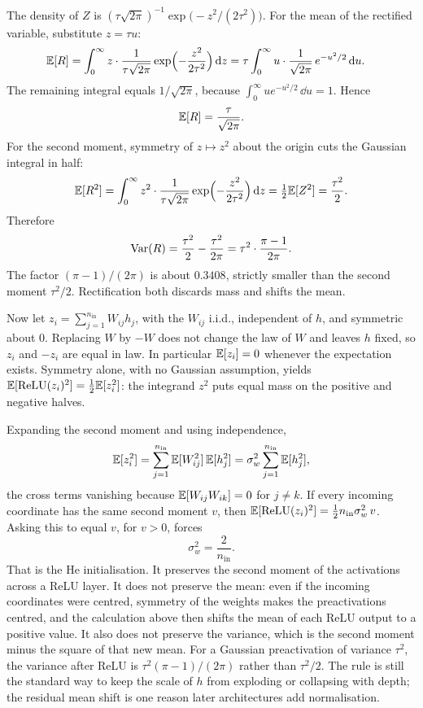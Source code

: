 The density of \(Z\) is \((\tau\sqrt{2\pi})^{-1}\exp\bigl(-z^2/(2\tau^2)\bigr)\). For the mean of the rectified variable, substitute \(z=\tau u\):
\begin{align*}
  \mathbb{E}[R]
  &=
  \int_0^\infty z\cdot\frac{1}{\tau\sqrt{2\pi}}
  \exp\Bigl(-\frac{z^2}{2\tau^2}\Bigr)\,\mathrm{d} z
  =
  \tau\int_0^\infty u\cdot\frac{1}{\sqrt{2\pi}}\,e^{-u^2/2}\,\mathrm{d} u.
\end{align*}
The remaining integral equals \(1/\sqrt{2\pi}\), because \(\int_0^\infty u e^{-u^2/2}\,\dd u = 1\). Hence
\[
  \mathbb{E}[R] = \frac{\tau}{\sqrt{2\pi}}.
\]
For the second moment, symmetry of \(z\mapsto z^2\) about the origin cuts the Gaussian integral in half:
\[
  \mathbb{E}[R^2]
  =
  \int_0^\infty z^2\cdot\frac{1}{\tau\sqrt{2\pi}}
  \exp\Bigl(-\frac{z^2}{2\tau^2}\Bigr)\,\mathrm{d} z
  =
  \tfrac12\mathbb{E}[Z^2]
  =
  \frac{\tau^2}{2}.
\]
Therefore
\[
  \operatorname{Var}(R)
  =
  \frac{\tau^2}{2} - \frac{\tau^2}{2\pi}
  =
  \tau^2\cdot\frac{\pi-1}{2\pi}.
\]
The factor \((\pi-1)/(2\pi)\) is about \(0.3408\), strictly smaller than the second moment \(\tau^2/2\). Rectification both discards mass and shifts the mean.

Now let \(z_i = \sum_{j=1}^{n_{\mathrm{in}}} W_{ij} h_j\), with the \(W_{ij}\) i.i.d., independent of \(h\), and symmetric about \(0\). Replacing \(W\) by \(-W\) does not change the law of \(W\) and leaves \(h\) fixed, so \(z_i\) and \(-z_i\) are equal in law. In particular \(\mathbb{E}[z_i]=0\) whenever the expectation exists. Symmetry alone, with no Gaussian assumption, yields \(\mathbb{E}[\operatorname{ReLU}(z_i)^2] = \tfrac12\mathbb{E}[z_i^2]\): the integrand \(z^2\) puts equal mass on the positive and negative halves.

Expanding the second moment and using independence,
\[
  \mathbb{E}[z_i^2]
  =
  \sum_{j=1}^{n_{\mathrm{in}}} \mathbb{E}[W_{ij}^2]\,\mathbb{E}[h_j^2]
  =
  \sigma_w^2\sum_{j=1}^{n_{\mathrm{in}}}\mathbb{E}[h_j^2],
\]
the cross terms vanishing because \(\mathbb{E}[W_{ij}W_{ik}]=0\) for \(j\neq k\). If every incoming coordinate has the same second moment \(v\), then \(\mathbb{E}[\operatorname{ReLU}(z_i)^2] = \tfrac12 n_{\mathrm{in}}\sigma_w^2\, v\). Asking this to equal \(v\), for \(v>0\), forces
\[
  \sigma_w^2 = \frac{2}{n_{\mathrm{in}}}.
\]
That is the He initialisation. It preserves the second moment of the activations across a ReLU layer. It does not preserve the mean: even if the incoming coordinates were centred, symmetry of the weights makes the preactivations centred, and the calculation above then shifts the mean of each ReLU output to a positive value. It also does not preserve the variance, which is the second moment minus the square of that new mean. For a Gaussian preactivation of variance \(\tau^2\), the variance after ReLU is \(\tau^2(\pi-1)/(2\pi)\) rather than \(\tau^2/2\). The rule is still the standard way to keep the scale of \(h\) from exploding or collapsing with depth; the residual mean shift is one reason later architectures add normalisation.

